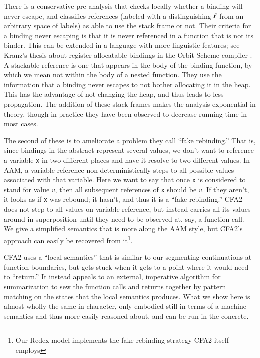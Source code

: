 %
There is a conservative pre-analysis that checks locally whether a binding will never escape, and classifies references (labeled with a distinguishing $\ell$ from an arbitrary space of labels) as able to use the stack frame or not.
%
Their criteria for a binding never escaping is that it is never referenced in a function that is not its binder.
%
This can be extended in a language with more linguistic features; see Kranz's thesis about register-allocatable bindings in the Orbit Scheme compiler \citep{ianjohnson:kranz:thesis:1988}.
%
A stackable reference is one that appears in the body of the binding function, by which we mean not within the body of a nested function.
%
They use the information that a binding never escapes to not bother allocating it in the heap.
%
This has the advantage of not changing the heap, and thus leads to less propagation.
%
The addition of these stack frames makes the analysis exponential in theory, though in practice they have been observed to decrease running time in most cases.

The second of these is to ameliorate a problem they call ``fake rebinding.''
%
That is, since bindings in the abstract represent several values, we don't want to reference a variable \texttt{x} in two different places and have it resolve to two different values.
%
In AAM, a variable reference non-deterministically steps to all possible values associated with that variable.
%
Here we want to say that once \texttt{x} is considered to stand for value $v$, then all subsequent references of \texttt{x} should be $v$.
%
If they aren't, it looks as if \texttt{x} was rebound; it hasn't, and thus it is a ``fake rebinding.''
%
CFA2 does not step to all values on variable reference, but instead carries all its values around in superposition until they need to be observed at, say, a function call.
%
We give a simplified semantics that is more along the AAM style, but CFA2's approach can easily be recovered from it\footnote{Our Redex model implements the fake rebinding strategy CFA2 itself employs}.

CFA2 uses a ``local semantics'' that is similar to our segmenting continuations at function boundaries, but gets stuck when it gets to a point where it would need to ``return.''
%
It instead appeals to an external, imperative algorithm for summarization to sew the function calls and returns together by pattern matching on the states that the local semantics produces.
%
What we show here is almost wholly the same in character, only embodied still in terms of a machine semantics and thus more easily reasoned about, and can be run in the concrete.


